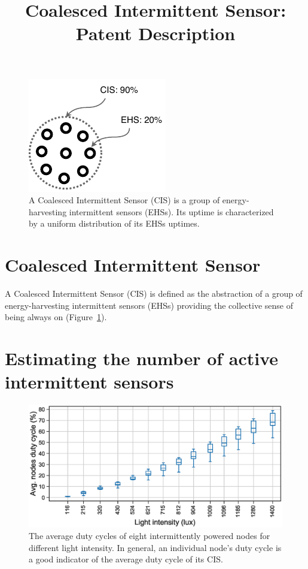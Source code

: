 \documentclass{article}
\title{Coalesced Intermittent Sensor: Patent Description}
\newcommand{\sys}{CIS\xspace}
\begin{document}
\maketitle

\begin{figure}[!h]
		\centering
		\includegraphics[]{figures/cis}
		\caption{A Coalesced Intermittent Sensor (CIS) is a group of energy-harvesting intermittent sensors (EHSs). Its uptime is characterized by a uniform distribution of its EHSs uptimes.}
		\label{fig:cis}
\end{figure}
\section*{Coalesced Intermittent Sensor}
A Coalesced Intermittent Sensor (CIS) is defined as the abstraction of a group of energy-harvesting intermittent sensors (EHSs) providing the collective sense of being always on (Figure~\ref{fig:cis}).

\section*{Estimating the number of active intermittent sensors}
%
\begin{figure}[t]
		\centering
		\includegraphics[width=.5\textwidth]{figures/cis_dutyCycle}
		\caption{The average duty cycles of eight intermittently powered nodes for different light intensity. In general, an individual node's duty cycle is a good indicator of the average duty cycle of its \sys.}
		\label{fig:cis_nodes_dutyCycle}
\end{figure} 
%
\end{document}
